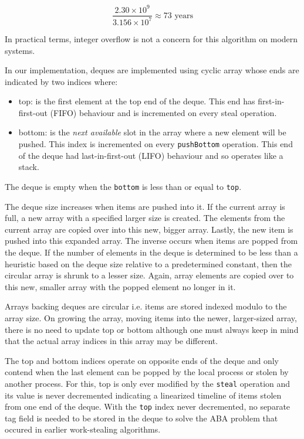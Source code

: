 \documentclass[11pt,a4paper]{article}
\begin{document}
\[
\frac{2.30 \times 10^{9}}{3.156 \times 10^{7}} \approx 73 \text{ years}
\]

In practical terms, integer overflow is not a concern for this algorithm on
modern systems.

In our implementation, deques are implemented using cyclic array whose ends are indicated by two
indices where:
\begin{itemize}[noitemsep, nosep]
    \item top: is the first element at the top end of the deque. This end has
    first-in-first-out (FIFO) behaviour and is incremented on every steal
    operation.
\item bottom: is the \emph{next available} slot in the array where a new element
    will be pushed. This index is incremented on every \texttt{pushBottom} operation.
    This end of the deque had last-in-first-out (LIFO) behaviour and so operates
    like a stack.
\end{itemize}

The deque is empty when the \texttt{bottom} is less than or equal to \texttt{top}.

The deque size increases when items are pushed into it. If the current array is
full, a new array with a specified larger size is created. The elements from the
current array are copied over into this new, bigger array. Lastly, the new item
is pushed into this expanded array. The inverse occurs when items are popped
from the deque. If the number of elements in the deque is determined to be less
than a heuristic based on the deque size relative to a predetermined constant,
then the circular array is shrunk to a lesser size. Again, array elements are
copied over to this new, smaller array with the popped element no longer in it.

Arrays backing deques are circular i.e. items are stored indexed modulo to the
array size. On growing the array, moving items into the newer, larger-sized
array, there is no need to update top or bottom although one must always keep in
mind that the actual array indices in this array may be different.

The top and bottom indices operate on opposite ends of the deque and only
contend when the last element can be popped by the local process or stolen
by another process. For this, top is only ever modified by the \texttt{steal}
operation and its value is never decremented indicating a linearized timeline of
items stolen from one end of the deque. With the \texttt{top} index never decremented,
no separate tag field is needed to be stored in the deque to solve the ABA
problem that occured in earlier work-stealing algorithms.
\end{document}
